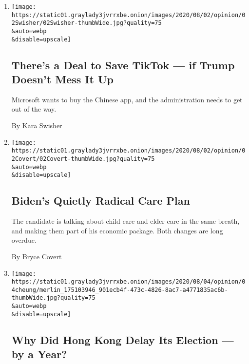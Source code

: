 \begin{enumerate}
\def\labelenumi{\arabic{enumi}.}
\item
  \href{/2020/08/02/opinion/02tik-tok-china-trump.html}{}

  \texttt{[image: https://static01.graylady3jvrrxbe.onion/images/2020/08/02/opinion/02Swisher/02Swisher-thumbWide.jpg?quality=75\\\&auto=webp\\\&disable=upscale]}

  \hypertarget{theres-a-deal-to-save-tiktok--if-trump-doesnt-mess-it-up}{%
  \subsection{There's a Deal to Save TikTok --- if Trump Doesn't Mess It
  Up}\label{theres-a-deal-to-save-tiktok--if-trump-doesnt-mess-it-up}}

  Microsoft wants to buy the Chinese app, and the administration needs
  to get out of the way.

  By Kara Swisher
\item
  \href{/2020/08/02/opinion/biden-child-care.html}{}

  \texttt{[image: https://static01.graylady3jvrrxbe.onion/images/2020/08/02/opinion/02Covert/02Covert-thumbWide.jpg?quality=75\\\&auto=webp\\\&disable=upscale]}

  \hypertarget{bidens-quietly-radical-care-plan}{%
  \subsection{Biden's Quietly Radical Care
  Plan}\label{bidens-quietly-radical-care-plan}}

  The candidate is talking about child care and elder care in the same
  breath, and making them part of his economic package. Both changes are
  long overdue.

  By Bryce Covert
\item
  \href{/2020/08/02/opinion/hong-kong-election-china.html}{}

  \texttt{[image: https://static01.graylady3jvrrxbe.onion/images/2020/08/04/opinion/04cheung/merlin\_175103946\_901ecb4f-473c-4826-8ac7-a4771835ac6b-thumbWide.jpg?quality=75\\\&auto=webp\\\&disable=upscale]}

  \hypertarget{why-did-hong-kong-delay-its-election--by-a-year}{%
  \subsection{Why Did Hong Kong Delay Its Election --- by a
  Year?}\label{why-did-hong-kong-delay-its-election--by-a-year}}


\end{enumerate}
